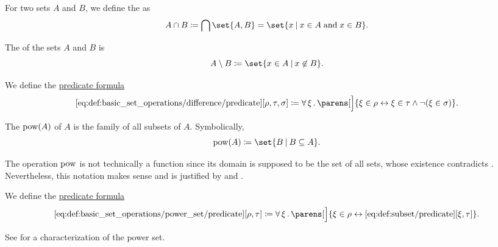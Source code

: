 \begin{definition}
\begin{thmenum}
    For two sets \( A \) and \( B \), we define the  as
    \begin{equation*}
      A \cap B \coloneqq \bigcap \set{ A, B } = \set{ x \given x \in A \T{and} x \in B }.
    \end{equation*}

     The  of the sets \( A \) and \( B \) is
    \begin{equation*}
      A \setminus B \coloneqq \set{ x \in A \given x \not\in B }.
    \end{equation*}

    We define the \hyperref[rem:predicate_formula]{predicate formula}
    \begin{equation*}\taglabel[\op{IsDifference}]{eq:def:basic_set_operations/difference/predicate}
      \ref{eq:def:basic_set_operations/difference/predicate}[\rho, \tau, \sigma] \coloneqq \qforall \xi \parens[\Big]{ \xi \in \rho \leftrightarrow \xi \in \tau \wedge \neg(\xi \in \sigma) }.
    \end{equation*}

     The  \( \operatorname{pow}(A) \) of \( A \) is the family of all subsets of \( A \). Symbolically,
    \begin{equation*}
      \pow(A) \coloneqq \set{ B \given B \subseteq A }.
    \end{equation*}

    The operation \( \operatorname{pow} \) is not technically a function since its domain is supposed to be the set of all sets, whose existence contradicts . Nevertheless, this notation makes sense and is justified by  and .

    We define the \hyperref[rem:predicate_formula]{predicate formula}
    \begin{equation*}\taglabel[\op{IsPowerSet}]{eq:def:basic_set_operations/power_set/predicate}
      \ref{eq:def:basic_set_operations/power_set/predicate}[\rho, \tau] \coloneqq \qforall \xi \parens[\Big]{ \xi \in \rho \leftrightarrow \ref{eq:def:subset/predicate}[\xi, \tau] }.
    \end{equation*}

    See  for a characterization of the power set.
  \end{thmenum}
\end{definition}

